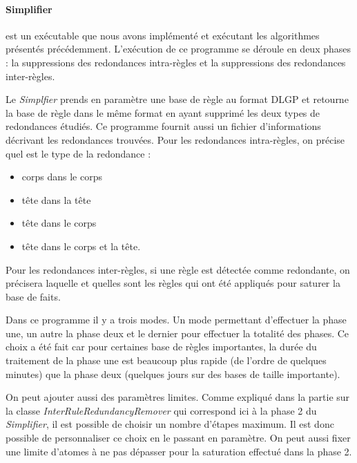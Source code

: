     \paragraph{Simplifier} est un exécutable que nous avons implémenté et exécutant les algorithmes présentés précédemment. 
    L'exécution de ce programme se déroule en deux phases : la suppressions des redondances intra-règles et la suppressions des redondances inter-règles. 
        \par Le \textit{Simplfier} prends en paramètre une base de règle au format DLGP et retourne la base de règle dans le même format en ayant supprimé les deux types de redondances étudiés. Ce programme fournit aussi un fichier d'informations décrivant les redondances trouvées. Pour les redondances intra-règles, on précise quel est le type de la redondance : 
        \begin{itemize}
            \item corps dans le corps
            \item tête dans la tête
            \item tête dans le corps
            \item tête dans le corps et la tête.
        \end{itemize}
        Pour les redondances inter-règles, si une règle est détectée comme redondante, on précisera laquelle et quelles sont les règles qui ont été appliqués pour saturer la base de faits. 
        \par Dans ce programme il y a trois modes. Un mode permettant d'effectuer la phase une, un autre la phase deux et le dernier pour effectuer la totalité des phases. Ce choix a été fait car pour certaines base de règles importantes, la durée du traitement de la phase une est beaucoup plus rapide (de l'ordre de quelques minutes) que la phase deux (quelques jours sur des bases de taille importante). 
        \par On peut ajouter aussi des paramètres limites. Comme expliqué dans la partie sur la classe \textit{InterRuleRedundancyRemover} qui correspond ici à la phase 2 du \textit{Simplifier}, il est possible de choisir un nombre d'étapes maximum. Il est donc possible de personnaliser ce choix en le passant en paramètre. On peut aussi fixer une limite d'atomes à ne pas dépasser pour la saturation effectué dans la phase 2. 
       

